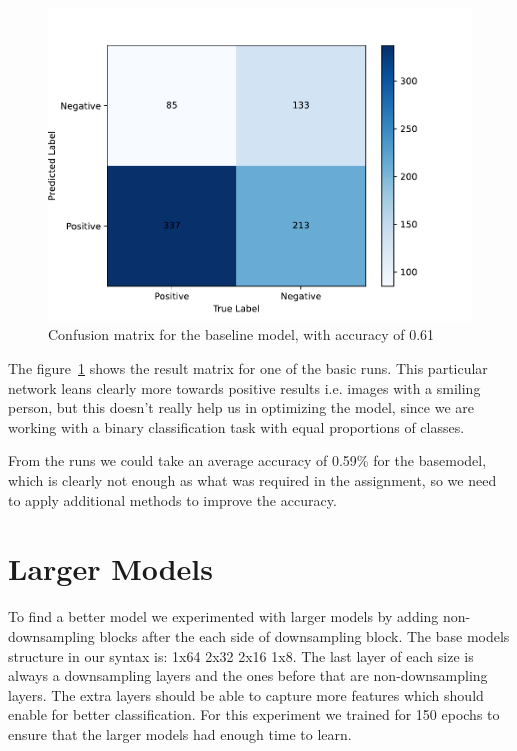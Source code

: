 \documentclass[12pt,a4paper,english
]{tunithesis}
\begin{document}
\begin{figure}
  \centering
  \includegraphics[width=\columnwidth]{img/confusion_matrix_basic.pdf}
  \caption{Confusion matrix for the baseline model, with accuracy of 0.61}
  \label{fig:confusion_matrix_basic}
\end{figure}

The figure~\ref{fig:confusion_matrix_basic} shows the result matrix for one of the basic runs. This particular network leans clearly more towards positive results i.e. images with a smiling person, but this doesn't really help us in optimizing the model, since we are working with a binary classification task with equal proportions of classes.

From the runs we could take an average accuracy of 0.59\% for the basemodel, which is clearly not enough as what was required in the assignment, so we need to apply additional methods to improve the accuracy.

\section{Larger Models}

To find a better model we experimented with larger models by adding non-downsampling blocks after the each side of downsampling block. The base models structure in our syntax is: 1x64 2x32 2x16 1x8. The last layer of each size is always a downsampling layers and the ones before that are non-downsampling layers. The extra layers should be able to capture more features which should enable for better classification. For this experiment we trained for 150 epochs to ensure that the larger models had enough time to learn.
\end{document}

